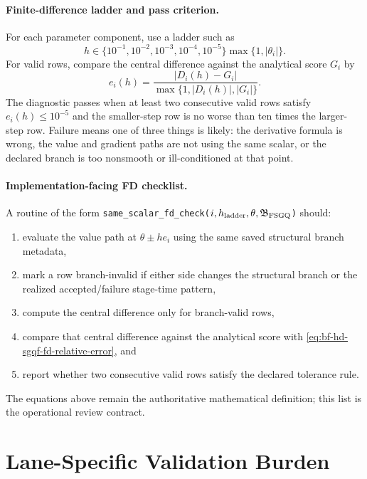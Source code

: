 \paragraph{Finite-difference ladder and pass criterion.}
For each parameter component, use a ladder such as
\begin{equation}
  h\in\{10^{-1},10^{-2},10^{-3},10^{-4},10^{-5}\}\max\{1,|\theta_i|\}.
  \label{eq:bf-hd-sgqf-fd-ladder}
\end{equation}
For valid rows, compare the central difference against the analytical score
\(G_i\) by
\begin{equation}
  e_i(h)=
  \frac{|D_i(h)-G_i|}{\max\{1,|D_i(h)|,|G_i|\}}.
  \label{eq:bf-hd-sgqf-fd-relative-error}
\end{equation}
The diagnostic passes when at least two consecutive valid rows satisfy
\(e_i(h)\le 10^{-5}\) and the smaller-step row is no worse than ten times the
larger-step row.  Failure means one of three things is likely: the derivative
formula is wrong, the value and gradient paths are not using the same scalar, or
the declared branch is too nonsmooth or ill-conditioned at that point.

\paragraph{Implementation-facing FD checklist.}
A routine of the form
\texttt{same\_scalar\_fd\_check(}$i,h_{\rm ladder},\theta,\mathfrak B_{\rm FSGQ}$\texttt{)}
should:
\begin{enumerate}[leftmargin=0.28in]
  \item evaluate the value path at \(\theta\pm he_i\) using the same saved
  structural branch metadata,
  \item mark a row branch-invalid if either side changes the structural branch or
  the realized accepted/failure stage-time pattern,
  \item compute the central difference only for branch-valid rows,
  \item compare that central difference against the analytical score with
  \eqref{eq:bf-hd-sgqf-fd-relative-error}, and
  \item report whether two consecutive valid rows satisfy the declared tolerance
  rule.
\end{enumerate}
The equations above remain the authoritative mathematical definition; this list is
the operational review contract.

\section{Lane-Specific Validation Burden}
\label{sec:bf-hd-sgqf-validation}

